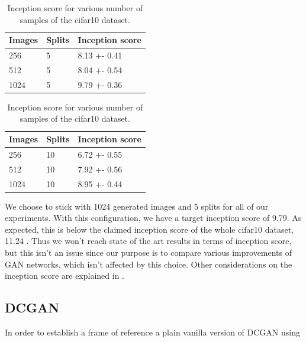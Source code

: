 \begin{table}[h]
\centering
\setlength{\tabcolsep}{0.5em} %

\begin{subtable}{.5\textwidth}
\centering

\begin{tabular}{l l l}
\toprule
Images & Splits & Inception score  \\ 
\midrule
      256  & 5 & 8.13 +- 0.41 \\   
      512  & 5 & 8.04 +- 0.54 \\ 
      1024 & 5 & 9.79 +- 0.36 \\
\bottomrule
\end{tabular}

\end{subtable}%
\begin{subtable}{.5\textwidth}
\centering

\begin{tabular}{l l l}
\toprule
Images & Splits & Inception score  \\ 
\midrule
      256  & 10 & 6.72 +- 0.55 \\   
      512  & 10 & 7.92 +- 0.56\\ 
      1024 & 10 & 8.95 +- 0.44 \\
\bottomrule
\end{tabular}
\end{subtable}%
%
\vspace{0.3cm}
\caption{Inception score for various number of samples of the cifar10 dataset.}
\label{table:exp-isc}
\end{table}%
We choose to stick with 1024 generated images and 5 splits for all of our experiments. With this configuration, we have a target inception score of 9.79. As expected, this is below the claimed inception score of the whole cifar10 dataset, 11.24 \cite{salimans2016improved}. Thus we won't reach state of the art results in terms of inception score, but this isn't an issue since our purpose is to compare various improvements of GAN networks, which isn't affected by this choice. Other considerations on the inception score are explained in \cite{barratt2018note}.


\subsection{DCGAN}
In order to establish a frame of reference a plain vanilla version of DCGAN using 




